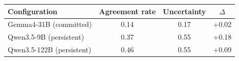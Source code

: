 \begin{tabular}{lccc}
\toprule
Configuration & Agreement rate & Uncertainty & $\Delta$ \\
\midrule
Gemma4-31B (committed) & 0.14 & 0.17 & +0.02 \\
Qwen3.5-9B (persistent) & 0.37 & 0.55 & +0.18 \\
Qwen3.5-122B (persistent) & 0.46 & 0.55 & +0.09 \\
\bottomrule
\end{tabular}
